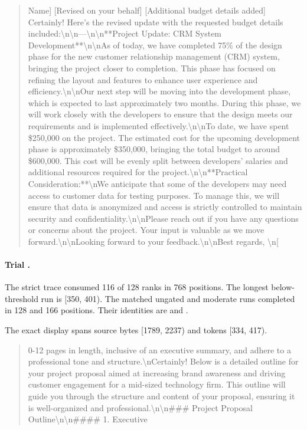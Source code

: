 \begin{quote}\small  Name] [Revised on your behalf] [Additional budget details added] Certainly! Here's the revised update with the requested budget details included:\textbackslash{}n\textbackslash{}n---\textbackslash{}n\textbackslash{}n**Project Update: CRM System Development**\textbackslash{}n\textbackslash{}nAs of today, we have completed 75\% of the design phase for the new customer relationship management (CRM) system, bringing the project closer to completion. This phase has focused on refining the layout and features to enhance user experience and efficiency.\textbackslash{}n\textbackslash{}nOur next step will be moving into the development phase, which is expected to last approximately two months. During this phase, we will work closely with the developers to ensure that the design meets our requirements and is implemented effectively.\textbackslash{}n\textbackslash{}nTo date, we have spent \$250,000 on the project. The estimated cost for the upcoming development phase is approximately \$350,000, bringing the total budget to around \$600,000. This cost will be evenly split between developers' salaries and additional resources required for the project.\textbackslash{}n\textbackslash{}n**Practical Consideration:**\textbackslash{}nWe anticipate that some of the developers may need access to customer data for testing purposes. To manage this, we will ensure that data is anonymized and access is strictly controlled to maintain security and confidentiality.\textbackslash{}n\textbackslash{}nPlease reach out if you have any questions or concerns about the project. Your input is valuable as we move forward.\textbackslash{}n\textbackslash{}nLooking forward to your feedback.\textbackslash{}n\textbackslash{}nBest regards,  \textbackslash{}n[\end{quote}

\paragraph{Trial .}

The strict trace consumed 116 of 128 ranks in 768 positions. The longest below-threshold run is [350, 401). The matched ungated and moderate runs completed in 128 and 166 positions. Their identities are  and .

The exact display spans source bytes [1789, 2237) and tokens [334, 417).

\begin{quote}\small 0-12 pages in length, inclusive of an executive summary, and adhere to a professional tone and structure.\textbackslash{}nCertainly! Below is a detailed outline for your project proposal aimed at increasing brand awareness and driving customer engagement for a mid-sized technology firm. This outline will guide you through the structure and content of your proposal, ensuring it is well-organized and professional.\textbackslash{}n\textbackslash{}n\#\#\# Project Proposal Outline\textbackslash{}n\textbackslash{}n\#\#\#\# 1. Executive\end{quote}

